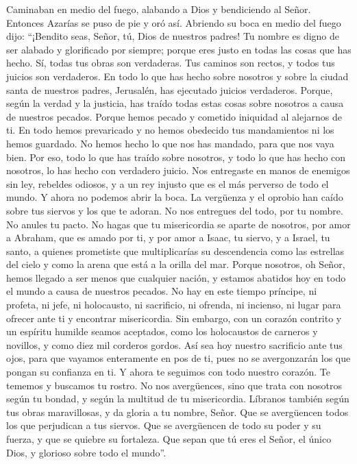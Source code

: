  Caminaban en medio del fuego, alabando a Dios y
bendiciendo al Señor.  Entonces Azarías se puso de pie y
oró así. Abriendo su boca en medio del fuego dijo: 
``¡Bendito seas, Señor, tú, Dios de nuestros padres! Tu nombre es digno
de ser alabado y glorificado por siempre;  porque eres
justo en todas las cosas que has hecho. Sí, todas tus obras son
verdaderas. Tus caminos son rectos, y todos tus juicios son verdaderos.
 En todo lo que has hecho sobre nosotros y sobre la
ciudad santa de nuestros padres, Jerusalén, has ejecutado juicios
verdaderos. Porque, según la verdad y la justicia, has traído todas
estas cosas sobre nosotros a causa de nuestros pecados. 
Porque hemos pecado y cometido iniquidad al alejarnos de ti.
 En todo hemos prevaricado y no hemos obedecido tus
mandamientos ni los hemos guardado. No hemos hecho lo que nos has
mandado, para que nos vaya bien.  Por eso, todo lo que
has traído sobre nosotros, y todo lo que has hecho con nosotros, lo has
hecho con verdadero juicio.  Nos entregaste en manos de
enemigos sin ley, rebeldes odiosos, y a un rey injusto que es el más
perverso de todo el mundo.  Y ahora no podemos abrir la
boca. La vergüenza y el oprobio han caído sobre tus siervos y los que te
adoran.  No nos entregues del todo, por tu nombre. No
anules tu pacto.  No hagas que tu misericordia se aparte
de nosotros, por amor a Abraham, que es amado por ti, y por amor a
Isaac, tu siervo, y a Israel, tu santo,  a quienes
prometiste que multiplicarías su descendencia como las estrellas del
cielo y como la arena que está a la orilla del mar. 
Porque nosotros, oh Señor, hemos llegado a ser menos que cualquier
nación, y estamos abatidos hoy en todo el mundo a causa de nuestros
pecados.  No hay en este tiempo príncipe, ni profeta, ni
jefe, ni holocausto, ni sacrificio, ni ofrenda, ni incienso, ni lugar
para ofrecer ante ti y encontrar misericordia.  Sin
embargo, con un corazón contrito y un espíritu humilde seamos aceptados,
 como los holocaustos de carneros y novillos, y como diez
mil corderos gordos. Así sea hoy nuestro sacrificio ante tus ojos, para
que vayamos enteramente en pos de ti, pues no se avergonzarán los que
pongan su confianza en ti.  Y ahora te seguimos con todo
nuestro corazón. Te tememos y buscamos tu rostro.  No nos
avergüences, sino que trata con nosotros según tu bondad, y según la
multitud de tu misericordia.  Líbranos también según tus
obras maravillosas, y da gloria a tu nombre, Señor. Que se avergüencen
todos los que perjudican a tus siervos.  Que se
avergüencen de todo su poder y su fuerza, y que se quiebre su fortaleza.
 Que sepan que tú eres el Señor, el único Dios, y
glorioso sobre todo el mundo''.

